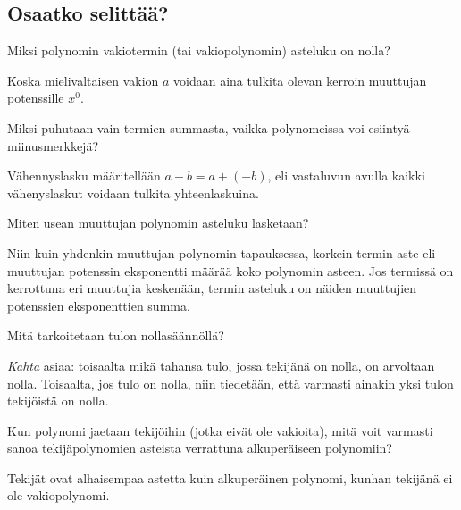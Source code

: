 \subsection*{Osaatko selittää?}
\begin{multicols}{2}

\begin{tehtava}
Miksi polynomin vakiotermin (tai vakiopolynomin) asteluku on nolla?
	\begin{vastaus}
	Koska mielivaltaisen vakion $a$ voidaan aina tulkita olevan kerroin muuttujan potenssille $x^0$.
	\end{vastaus}
\end{tehtava}

\begin{tehtava}
Miksi puhutaan vain termien summasta, vaikka polynomeissa voi esiintyä miinusmerkkejä?
	\begin{vastaus}
	Vähennyslasku määritellään $a-b=a+(-b)$, eli vastaluvun avulla kaikki vähenyslaskut voidaan tulkita yhteenlaskuina.
	\end{vastaus}
\end{tehtava}

\begin{tehtava}
Miten usean muuttujan polynomin asteluku lasketaan?
	\begin{vastaus}
	Niin kuin yhdenkin muuttujan polynomin tapauksessa, korkein termin aste eli muuttujan potenssin eksponentti määrää koko polynomin asteen. Jos termissä on kerrottuna eri muuttujia keskenään, termin asteluku on näiden muuttujien potenssien eksponenttien summa.
	\end{vastaus}
\end{tehtava}

\begin{tehtava}
Mitä tarkoitetaan tulon nollasäännöllä?
	\begin{vastaus}
\textit{Kahta} asiaa: toisaalta mikä tahansa tulo, jossa tekijänä on nolla, on arvoltaan nolla. Toisaalta, jos tulo on nolla, niin tiedetään, että varmasti ainakin yksi tulon tekijöistä on nolla.
	\end{vastaus}
\end{tehtava}

\begin{tehtava}
Kun polynomi jaetaan tekijöihin (jotka eivät ole vakioita), mitä voit varmasti sanoa tekijäpolynomien asteista verrattuna alkuperäiseen polynomiin?
	\begin{vastaus}
Tekijät ovat alhaisempaa astetta kuin alkuperäinen polynomi, kunhan tekijänä ei ole vakiopolynomi.
	\end{vastaus}
\end{tehtava}


\end{multicols}
